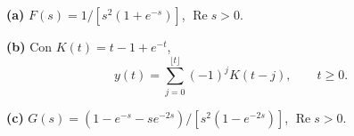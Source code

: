 \noindent\textbf{(a)} $F(s)=1/[s^2(1+e^{-s})]$, $\operatorname{Re}s>0$.

\noindent\textbf{(b)} Con $K(t)=t-1+e^{-t}$,
\[y(t)=\sum_{j=0}^{\lfloor t\rfloor}(-1)^j K(t-j),\qquad t\ge0.\]

\noindent\textbf{(c)} $G(s)=(1-e^{-s}-se^{-2s})/[s^2(1-e^{-2s})]$, $\operatorname{Re}s>0$.
